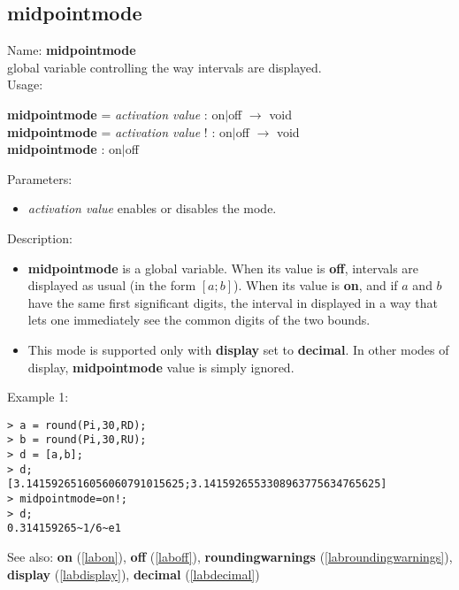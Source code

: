 \subsection{midpointmode}
\label{labmidpointmode}
\noindent Name: \textbf{midpointmode}\\
global variable controlling the way intervals are displayed.\\
\noindent Usage: 
\begin{center}
\textbf{midpointmode} = \emph{activation value} : \textsf{on$|$off} $\rightarrow$ \textsf{void}\\
\textbf{midpointmode} = \emph{activation value} ! : \textsf{on$|$off} $\rightarrow$ \textsf{void}\\
\textbf{midpointmode} : \textsf{on$|$off}\\
\end{center}
Parameters: 
\begin{itemize}
\item \emph{activation value} enables or disables the mode.
\end{itemize}
\noindent Description: \begin{itemize}

\item \textbf{midpointmode} is a global variable. When its value is \textbf{off}, intervals are displayed
   as usual (in the form $\left[ a;b\right]$).
   When its value is \textbf{on}, and if $a$ and $b$ have the same first significant digits,
   the interval in displayed in a way that lets one immediately see the common
   digits of the two bounds.

\item This mode is supported only with \textbf{display} set to \textbf{decimal}. In other modes of 
   display, \textbf{midpointmode} value is simply ignored.
\end{itemize}
\noindent Example 1: 
\begin{center}\begin{minipage}{15cm}\begin{Verbatim}[frame=single]
> a = round(Pi,30,RD);
> b = round(Pi,30,RU);
> d = [a,b];
> d;
[3.1415926516056060791015625;3.1415926553308963775634765625]
> midpointmode=on!;
> d;
0.314159265~1/6~e1
\end{Verbatim}
\end{minipage}\end{center}
See also: \textbf{on} (\ref{labon}), \textbf{off} (\ref{laboff}), \textbf{roundingwarnings} (\ref{labroundingwarnings}), \textbf{display} (\ref{labdisplay}), \textbf{decimal} (\ref{labdecimal})
